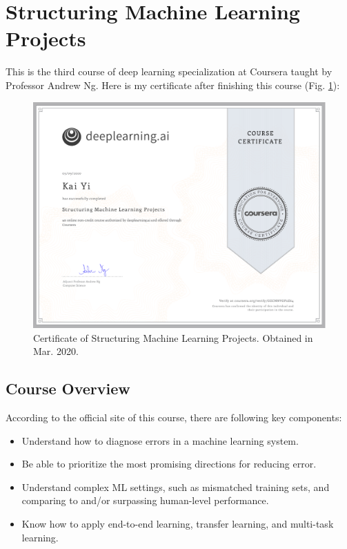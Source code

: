\section{Structuring Machine Learning Projects}
This is the third course of deep learning specialization at Coursera taught by Professor Andrew Ng. Here is my certificate after finishing this course (Fig. \ref{C3-Certificate}):

\begin{figure}[!htbp]
    \centering
    \includegraphics[width=1.0\textwidth]{img/C3-Certificate.pdf}
    \caption{Certificate of Structuring Machine Learning Projects. Obtained in Mar. 2020.}
    \label{C3-Certificate}
\end{figure}

\subsection{Course Overview}
According to the official site of this course, there are following key components:

\begin{itemize}
    \item Understand how to diagnose errors in a machine learning system.
    \item Be able to prioritize the most promising directions for reducing error.
    \item Understand complex ML settings, such as mismatched training sets, and comparing to and/or surpassing human-level performance.
    \item Know how to apply end-to-end learning, transfer learning, and multi-task learning.
\end{itemize}

